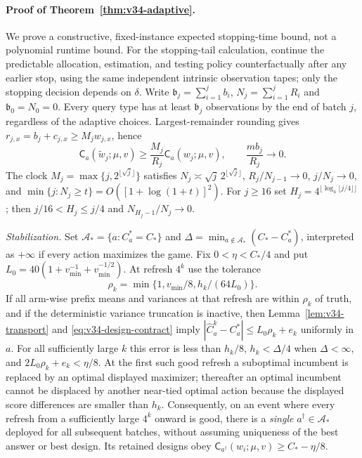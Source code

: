 \documentclass{article}
\theoremstyle{plain}
\theoremstyle{definition}
\begin{document}
\paragraph{Proof of Theorem~\ref{thm:v34-adaptive}.}
We prove a constructive, fixed-instance expected stopping-time bound,
not a polynomial runtime bound. For the stopping-tail calculation,
continue the predictable allocation, estimation, and testing policy
counterfactually after any earlier stop, using the same independent
intrinsic observation tapes; only the stopping decision depends on
$\delta$. Write
$\mathfrak b_j=\sum_{i=1}^j b_i$,
$N_j=\sum_{i=1}^jR_i$ and $\mathfrak b_0=N_0=0$.
Every query type has at least $\mathfrak b_j$ observations by the end
of batch $j$, regardless of the adaptive choices. Largest-remainder
rounding gives $r_{j,x}=b_j+c_{j,x}\ge M_jw_{j,x}$, hence
\begin{equation}
 \mathsf C_a(\widetilde w_j;\mu,v)\ge
 \frac{M_j}{R_j}\mathsf C_a(w_j;\mu,v),
 \qquad \frac{mb_j}{R_j}\longrightarrow0.
 \label{eq:v34-domination-repaired}
\end{equation}
The clock $M_j=\max\{j,2^{\lfloor\sqrt j\rfloor}\}$
satisfies $N_j\asymp\sqrt j\,2^{\lfloor\sqrt j\rfloor}$,
$R_j/N_{j-1}\to0$, $j/N_j\to0$, and
$\min\{j:N_j\ge t\}=O([1+\log(1+t)]^2)$.
For $j\ge16$ set
$H_j=4^{\lfloor\log_4\lfloor j/4\rfloor\rfloor}$;
then $j/16<H_j\le j/4$ and $N_{H_j-1}/N_j\to0$.

\emph{Stabilization.}
Set $\mathcal A_*=\{a:C_a^*=C_*\}$ and
$\Delta=\min_{a\notin\mathcal A_*}(C_*-C_a^*)$, interpreted as
$+\infty$ if every action maximizes the game. Fix
$0<\eta<C_*/4$ and put
$L_0=40(1+v_{\min}^{-1}+v_{\min}^{-1/2})$.
At refresh $4^k$ use the tolerance
\begin{equation}
 \rho_k=\min\{1,v_{\min}/8,h_k/(64L_0)\}.
 \label{eq:v34-refresh-radius}
\end{equation}
If all arm-wise prefix means and variances at that refresh are within
$\rho_k$ of truth, and if the deterministic variance truncation is
inactive, then Lemma~\ref{lem:v34-transport} and
\eqref{eq:v34-design-contract} imply
$|\widehat C_a^k-C_a^*|\le L_0\rho_k+e_k$ uniformly in $a$.
For all sufficiently large $k$ this error is less than $h_k/8$,
$h_k<\Delta/4$ when $\Delta<\infty$, and
$2L_0\rho_k+e_k<\eta/8$.
At the first such good refresh a suboptimal incumbent is replaced by
an optimal displayed maximizer; thereafter an optimal incumbent cannot
be displaced by another near-tied optimal action because the displayed
score differences are smaller than $h_k$. Consequently, on an event
where every refresh from a sufficiently large $4^k$ onward is good,
there is a \emph{single} $a^\dagger\in\mathcal A_*$ deployed for
all subsequent batches, without assuming uniqueness of the best
answer or best design. Its retained designs obey
$\mathsf C_{a^\dagger}(w_i;\mu,v)\ge C_*-\eta/8$.
\end{document}
